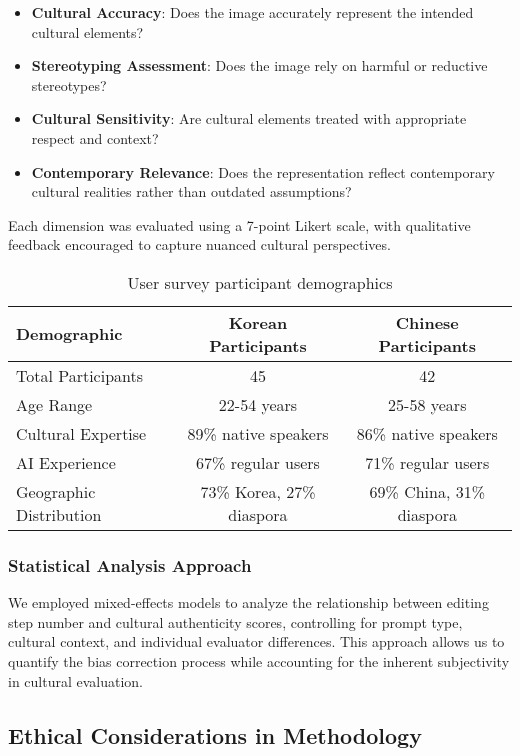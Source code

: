 \documentclass{article}
\begin{document}
\begin{itemize}
\item \textbf{Cultural Accuracy}: Does the image accurately represent the intended cultural elements?
\item \textbf{Stereotyping Assessment}: Does the image rely on harmful or reductive stereotypes?
\item \textbf{Cultural Sensitivity}: Are cultural elements treated with appropriate respect and context?
\item \textbf{Contemporary Relevance}: Does the representation reflect contemporary cultural realities rather than outdated assumptions?
\end{itemize}

Each dimension was evaluated using a 7-point Likert scale, with qualitative feedback encouraged to capture nuanced cultural perspectives.

\begin{table}[h]
  \caption{User survey participant demographics}
  \label{table:participant-demographics}
  \centering
  \begin{tabular}{lcc}
    \toprule
    Demographic & Korean Participants & Chinese Participants \\
    \midrule
    Total Participants & 45 & 42 \\
    Age Range & 22-54 years & 25-58 years \\
    Cultural Expertise & 89\% native speakers & 86\% native speakers \\
    AI Experience & 67\% regular users & 71\% regular users \\
    Geographic Distribution & 73\% Korea, 27\% diaspora & 69\% China, 31\% diaspora \\
    \bottomrule
  \end{tabular}
\end{table}

\subsubsection{Statistical Analysis Approach}
We employed mixed-effects models to analyze the relationship between editing step number and cultural authenticity scores, controlling for prompt type, cultural context, and individual evaluator differences. This approach allows us to quantify the bias correction process while accounting for the inherent subjectivity in cultural evaluation.

\subsection{Ethical Considerations in Methodology}
\end{document}
